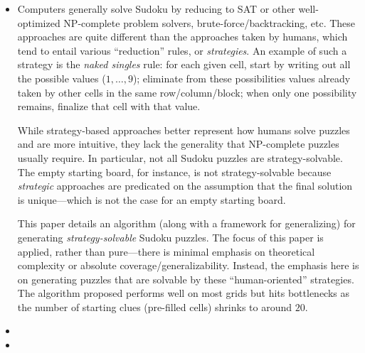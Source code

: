 \documentclass{extarticle}
\begin{document}
\begin{itemize}
  \item {}

    \begin{annotation}
      Computers generally solve Sudoku by reducing to SAT or other
      well-optimized NP-complete problem solvers, brute-force/backtracking,
      etc.  These approaches are quite different than the approaches taken by
      humans, which tend to entail various ``reduction'' rules, or
      \emph{strategies}.  An example of such a strategy is the \emph{naked
      singles} rule: for each given cell, start by writing out all the possible
      values (\(1, \dots, 9\)); eliminate from these possibilities values
      already taken by other cells in the same row/column/block; when only one
      possibility remains, finalize that cell with that value.

      While strategy-based approaches better represent how humans solve puzzles
      and are more intuitive, they lack the generality that NP-complete puzzles
      usually require.  In particular, not all Sudoku puzzles are
      strategy-solvable.  The empty starting board, for instance, is not
      strategy-solvable because \emph{strategic} approaches are predicated on
      the assumption that the final solution is unique---which is not the case
      for an empty starting board.

      This paper details an algorithm (along with a framework for generalizing)
      for generating \emph{strategy-solvable} Sudoku puzzles.  The focus of
      this paper is applied, rather than pure---there is minimal emphasis on
      theoretical complexity or absolute coverage/generalizability.  Instead,
      the emphasis here is on generating puzzles that are solvable by these
      ``human-oriented'' strategies.  The algorithm proposed performs well on
      most grids but hits bottlenecks as the number of starting clues
      (pre-filled cells) shrinks to around \(20\).
    \end{annotation}

  \item {}

  \item {}

\end{itemize}
\end{document}
